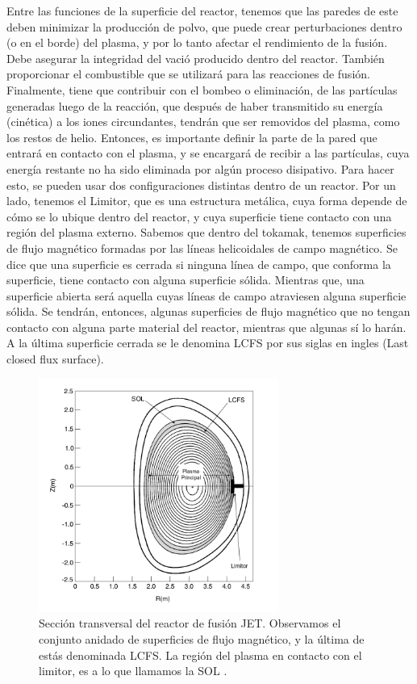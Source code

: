 \documentclass[../main.tex]{subfiles}
\begin{document}
	Entre las funciones de la superficie del reactor, tenemos que las paredes de este deben minimizar la producción de polvo, que puede crear perturbaciones dentro (o en el borde) del plasma, y por lo tanto afectar el rendimiento de la fusión. Debe asegurar la integridad del vació producido dentro del reactor. También proporcionar el combustible que se utilizará para las reacciones de fusión. Finalmente, tiene que contribuir con el bombeo o eliminación, de las partículas generadas luego de la reacción, que después de haber transmitido su energía (cinética) a los iones circundantes, tendrán que ser removidos del plasma, como los restos de helio. Entonces, es importante definir la parte de la pared que entrará en contacto con el plasma, y se encargará de recibir a las partículas, cuya energía restante no ha sido eliminada por algún proceso disipativo. Para hacer esto, se pueden usar dos configuraciones distintas dentro de un reactor. Por un lado, tenemos el Limitor, que es una estructura metálica, cuya forma depende de cómo se lo ubique dentro del reactor, y cuya superficie tiene contacto con una región del plasma externo. Sabemos que dentro del tokamak, tenemos superficies de flujo magnético formadas por las líneas helicoidales de campo magnético. Se dice que una superficie es cerrada si ninguna línea de campo, que conforma la superficie, tiene contacto con alguna superficie sólida. Mientras que, una superficie abierta será aquella cuyas líneas de campo atraviesen alguna superficie sólida. Se tendrán, entonces, algunas superficies de flujo magnético que no tengan contacto con alguna parte material del reactor, mientras que algunas sí lo harán. A la última superficie cerrada se le denomina LCFS por sus siglas en ingles (Last closed flux surface). \\
    
        \begin{figure}[h]
        \centering
        \includegraphics[width=0.7\textwidth]{Images/sol_lcfs.jpg}
        \caption{Sección transversal del reactor de fusión JET. Observamos el conjunto anidado de superficies de flujo magnético, y la última de estás denominada LCFS. La región del plasma en contacto con el limitor, es a lo que llamamos la SOL \cite{stangeby2000plasma}.}
        \label{fig:sol_jet}
        \end{figure}
    
\end{document}
